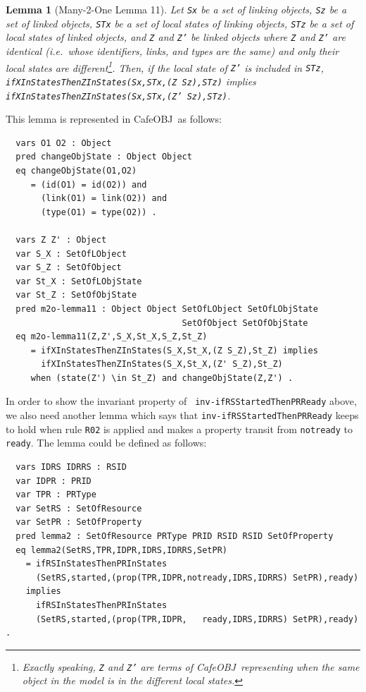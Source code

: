 \documentclass[12pt]{report}
\newtheorem{lemma}{Lemma}
\newcommand{\stt}[1]{{\small{\tt {#1}}}}
\newcommand{\cafeobj}{{\sf CafeOBJ}~}
\begin{document}
\begin{lemma}[Many-2-One Lemma 11]
  Let {\tt Sx} be a set of linking objects, {\tt Sz} be a set of
  linked objects, {\tt STx} be a set of local states of linking
  objects, {\tt STz} be a set of local states of linked objects, and
  {\tt Z} and {\tt Z'} be linked objects where {\tt Z} and {\tt Z'}
  are identical (i.e.\ whose identifiers, links, and types are the
  same) and only their local states are different\footnote{Exactly
    speaking, {\tt Z} and {\tt Z'} are terms of \cafeobj representing
    when the same object in the model is in the different local
    states.}.  Then, if the local state of {\tt Z'} is included in
  {\tt STz}, \stt{ifXInStatesThenZInStates(Sx,STx,(Z Sz),STz)}
  implies\\ \stt{ifXInStatesThenZInStates(Sx,STx,(Z' Sz),STz)}.
\end{lemma}
This lemma is represented in \cafeobj as follows:
\small
\begin{verbatim}
  vars O1 O2 : Object
  pred changeObjState : Object Object
  eq changeObjState(O1,O2)
     = (id(O1) = id(O2)) and 
       (link(O1) = link(O2)) and
       (type(O1) = type(O2)) .

  vars Z Z' : Object
  var S_X : SetOfLObject
  var S_Z : SetOfObject
  var St_X : SetOfLObjState
  var St_Z : SetOfObjState
  pred m2o-lemma11 : Object Object SetOfLObject SetOfLObjState
                                   SetOfObject SetOfObjState
  eq m2o-lemma11(Z,Z',S_X,St_X,S_Z,St_Z)
     = ifXInStatesThenZInStates(S_X,St_X,(Z S_Z),St_Z) implies
       ifXInStatesThenZInStates(S_X,St_X,(Z' S_Z),St_Z) 
     when (state(Z') \in St_Z) and changeObjState(Z,Z') .
\end{verbatim}
\normalsize
In order to show the invariant property of {\tt
  inv-ifRSStartedThenPRReady} above, we also need another lemma which
says that {\tt inv-ifRSStartedThenPRReady} keeps to hold when rule
{\tt R02} is applied and makes a property transit from {\tt notready}
to {\tt ready}.  The lemma could be defined as follows:
\small
\begin{verbatim}
  vars IDRS IDRRS : RSID 
  var IDPR : PRID
  var TPR : PRType
  var SetRS : SetOfResource
  var SetPR : SetOfProperty
  pred lemma2 : SetOfResource PRType PRID RSID RSID SetOfProperty
  eq lemma2(SetRS,TPR,IDPR,IDRS,IDRRS,SetPR)
    = ifRSInStatesThenPRInStates
      (SetRS,started,(prop(TPR,IDPR,notready,IDRS,IDRRS) SetPR),ready)
    implies
      ifRSInStatesThenPRInStates
      (SetRS,started,(prop(TPR,IDPR,   ready,IDRS,IDRRS) SetPR),ready) .
\end{verbatim}
\end{document}
